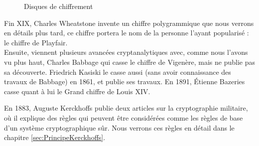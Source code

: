 \begin{figure}[h]
  \begin{center}
    \hspace{1.5cm}
  \end{center}
  \vspace{-10pt}
  \caption{Disques de chiffrement}
  \vspace{-10pt}
  \label{fig:JeffersonDisks}
\end{figure}

Fin XIX\ieme, Charles Wheatstone invente un chiffre
polygrammique que nous verrons en détails plus tard, ce chiffre
portera le nom de la personne l'ayant popularisé : le chiffre
  de Playfair. \\

Ensuite, viennent plusieurs avancées cryptanalytiques avec, comme nous
l'avons vu plus haut, Charles Babbage qui casse le chiffre de
Vigenère, mais ne publie pas sa découverte. Friedrich Kasiski
le casse aussi (sans avoir connaissance des travaux de
Babbage) en 1861, et publie ses travaux. En 1891, Étienne
  Bazeries casse quant à lui le Grand chiffre de Louis XIV. 

En 1883, Auguste Kerckhoffs publie deux articles sur la
cryptographie militaire, où il explique des règles qui peuvent être
considérées comme les règles de base d'un système cryptographique
sûr. Nous verrons ces règles en détail dans le chapitre
\ref{sec:PrincipeKerckhoffs}. \\
\clearpage

